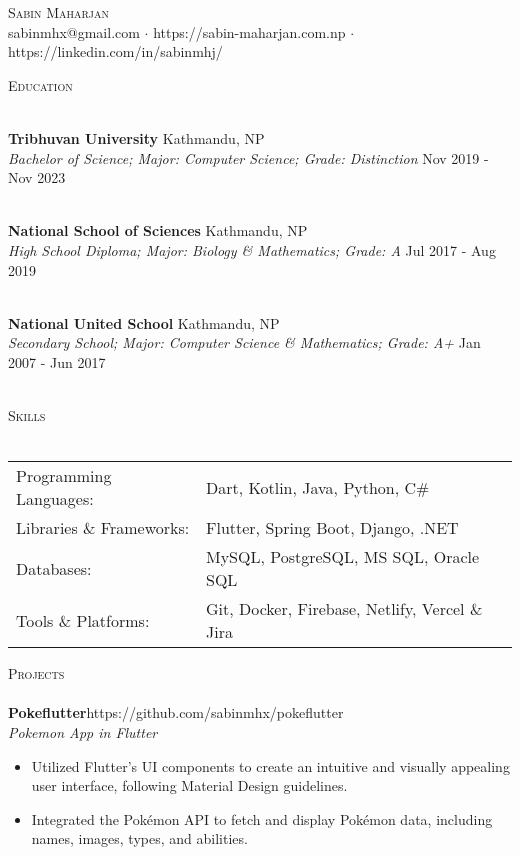 \documentclass[a4paper]{article}
\newcommand{\lineunder} {
    \vspace*{-8pt} \\
    \hspace*{-18pt} \hrulefill \\
}
\newcommand{\header} [1] {
    {\hspace*{-18pt}\vspace*{6pt} \textsc{#1}}
    \vspace*{-6pt} \lineunder
}
\begin{document}
\vspace*{-40pt}

    

\vspace*{-10pt}
\begin{center}
	{\Huge \scshape {Sabin Maharjan}}\\
	sabinmhx@gmail.com $\cdot$ https://sabin-maharjan.com.np $\cdot$ https://linkedin.com/in/sabinmhj/\\
\end{center}



\header{Education}
\vspace{1mm}

\textbf{Tribhuvan University} \hfill Kathmandu, NP\\
\textit{Bachelor of Science; Major: Computer Science; Grade: Distinction} \hfill Nov 2019 - Nov 2023\\
\vspace{-1mm}
\

\textbf{National School of Sciences} \hfill Kathmandu, NP\\
\textit{High School Diploma; Major: Biology \& Mathematics; Grade: A} \hfill Jul 2017 - Aug 2019\\
\vspace{-1mm}
\

\textbf{National United School} \hfill Kathmandu, NP\\
\textit{Secondary School; Major: Computer Science \& Mathematics; Grade: A+} \hfill Jan 2007 - Jun 2017\\
\vspace{-1mm}
\


\header{Skills}
\begin{tabularx}{\textwidth}{ l X } 
	Programming Languages: & Dart, Kotlin, Java, Python, C\#      \\
	Libraries \& Frameworks:  & Flutter, Spring Boot, Django, .NET  \\
    Databases:  & MySQL, PostgreSQL, MS SQL, Oracle SQL  \\
    Tools \& Platforms:  & Git, Docker, Firebase, Netlify, Vercel \& Jira \\
\end{tabularx}
\vspace{2mm}

\header{Projects}

{\textbf{Pokeflutter}}\hfill https://github.com/sabinmhx/pokeflutter\\
\textit{Pokemon App in Flutter}
\begin{itemize} \itemsep 1pt
	\item Utilized Flutter's UI components to create an intuitive and visually appealing user interface, following Material Design guidelines.  
	\item Integrated the Pokémon API to fetch and display Pokémon data, including names, images, types, and abilities.
\end{itemize}
\vspace*{2mm}
\end{document}
